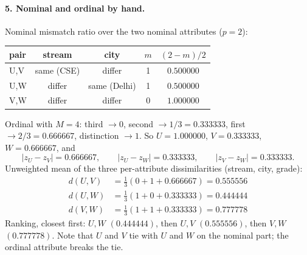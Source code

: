 \documentclass[11pt]{article}
\begin{document}
\paragraph{5. Nominal and ordinal by hand.}
Nominal mismatch ratio over the two nominal attributes ($p = 2$):
\begin{center}
\begin{tabular}{lcccc}
  \toprule
  pair & stream & city & $m$ & $(2-m)/2$ \\ \midrule
  U,V & same (CSE) & differ & 1 & $0.500000$ \\
  U,W & differ & same (Delhi) & 1 & $0.500000$ \\
  V,W & differ & differ & 0 & $1.000000$ \\
  \bottomrule
\end{tabular}
\end{center}
Ordinal with $M = 4$: third $\to 0$, second $\to 1/3 = 0.333333$,
first $\to 2/3 = 0.666667$, distinction $\to 1$. So $U = 1.000000$,
$V = 0.333333$, $W = 0.666667$, and
\[
  |z_U - z_V| = 0.666667, \qquad
  |z_U - z_W| = 0.333333, \qquad
  |z_V - z_W| = 0.333333.
\]
Unweighted mean of the three per-attribute dissimilarities (stream, city,
grade):
\begin{align*}
  d(U,V) &= \tfrac{1}{3}(0 + 1 + 0.666667) = 0.555556 \\
  d(U,W) &= \tfrac{1}{3}(1 + 0 + 0.333333) = 0.444444 \\
  d(V,W) &= \tfrac{1}{3}(1 + 1 + 0.333333) = 0.777778
\end{align*}
Ranking, closest first: $U,W$ $(0.444444)$, then $U,V$ $(0.555556)$, then
$V,W$ $(0.777778)$. Note that $U$ and $V$ tie with $U$ and $W$ on the nominal
part; the ordinal attribute breaks the tie.
\end{document}
